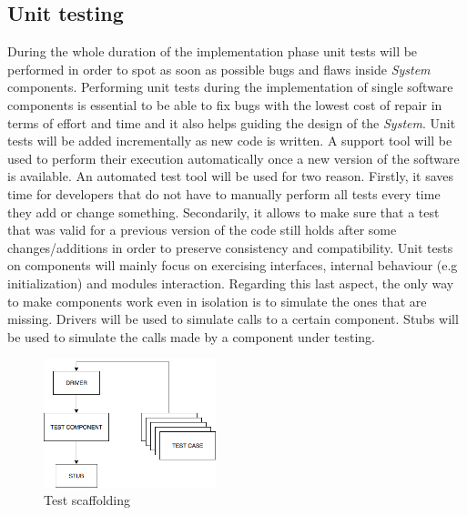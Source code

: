 \documentclass[titlepage]{article}
\begin{document}
	\subsection{Unit testing}
	During the whole duration of the implementation phase unit tests will be performed in order to spot as soon as possible bugs and flaws inside {\it System} components. Performing unit tests during the implementation of single software components is essential to be able to fix bugs with the lowest cost of repair in terms of effort and time and it also helps guiding the design of the {\it System}.
	Unit tests will be added incrementally as new code is written. A support tool will be used to perform their execution automatically once a new version of the software is available. An automated test tool will be used for two reason. Firstly, it saves time for developers that do not have to manually perform all tests every time they add or change something. Secondarily, it allows to make sure that a test that was valid for a previous version of the code still holds after some changes/additions in order to preserve consistency and compatibility.
	Unit tests on components will mainly focus on exercising interfaces, internal behaviour (e.g initialization) and modules\textsc{} interaction. Regarding this last aspect, the only way to make components work even in isolation is to simulate the ones that are missing. Drivers will be used to simulate calls to a certain component. Stubs will be used to simulate the calls made by a component under testing.
	\begin{figure}[H]
		\center
		\includegraphics[width=5cm]{UnitTest.png}
		\caption{Test scaffolding}
		\label{fig:testScaffoling}
	\end{figure}
	
\end{document}
